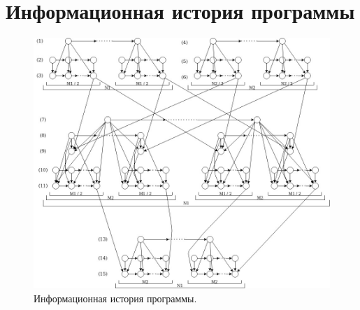 \documentclass[12pt]{report}
\begin{document}
\section{Информационная история программы}

\begin{figure}[h]
	\centering
	\includegraphics[scale=0.55]{inf_history.jpg}
	\caption{Информационная история программы.}
	\label{fig:mpr}
\end{figure}




\end{document}

